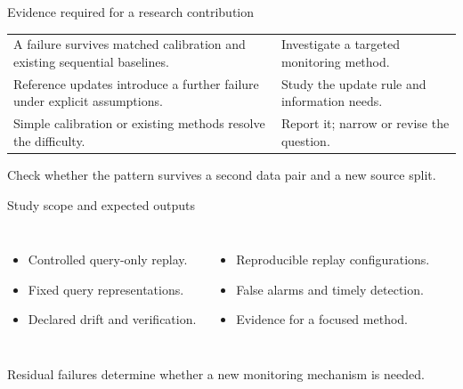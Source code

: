 \begin{frame}[t]{Evidence required for a research contribution}
\vspace{0.2cm}
\renewcommand{\arraystretch}{1.4}
{\small
\begin{tabularx}{\textwidth}{@{}L{7.0cm}Y@{}}
\toprule
{} & \\
\midrule
A failure survives matched calibration and existing sequential baselines. &
Investigate a targeted monitoring method.\\
Reference updates introduce a further failure under explicit assumptions. &
Study the update rule and information needs.\\
Simple calibration or existing methods resolve the difficulty. &
Report it; narrow or revise the question.\\
\bottomrule
\end{tabularx}\par}
\vspace{0.5cm}
Check whether the pattern survives a second data pair and a new source split.
\end{frame}

\begin{frame}[t]{Study scope and expected outputs}
\vspace{0.2cm}
\begin{columns}[T,onlytextwidth]
\begin{itemize}\setlength\itemsep{0.55em}
\item Controlled query-only replay.
\item Fixed query representations.
\item Declared drift and verification.
\end{itemize}
\begin{itemize}\setlength\itemsep{0.55em}
\item Reproducible replay configurations.
\item False alarms and timely detection.
\item Evidence for a focused method.
\end{itemize}
\end{columns}
\par\vspace{0.25cm}
{\small Residual failures determine whether a new monitoring mechanism is needed.\par}
\end{frame}
